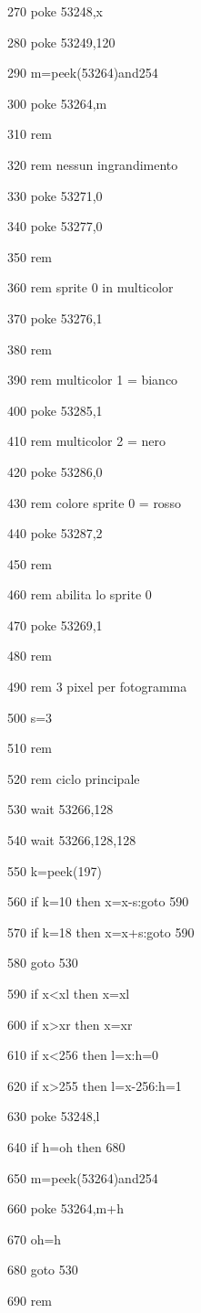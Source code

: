 \documentclass{article}
\begin{document}
270 poke 53248,x

280 poke 53249,120

290 m=peek(53264)and254

300 poke 53264,m

310 rem

320 rem nessun ingrandimento

330 poke 53271,0

340 poke 53277,0

350 rem

360 rem sprite 0 in multicolor

370 poke 53276,1

380 rem

390 rem multicolor 1 = bianco

400 poke 53285,1

410 rem multicolor 2 = nero

420 poke 53286,0

430 rem colore sprite 0 = rosso

440 poke 53287,2

450 rem

460 rem abilita lo sprite 0

470 poke 53269,1

480 rem

490 rem 3 pixel per fotogramma

500 s=3

510 rem

520 rem ciclo principale

530 wait 53266,128

540 wait 53266,128,128

550 k=peek(197)

560 if k=10 then x=x-s:goto 590

570 if k=18 then x=x+s:goto 590

580 goto 530

590 if x{\textless}xl then x=xl

600 if x{\textgreater}xr then x=xr

610 if x{\textless}256 then l=x:h=0

620 if x{\textgreater}255 then l=x-256:h=1

630 poke 53248,l

640 if h=oh then 680

650 m=peek(53264)and254

660 poke 53264,m+h

670 oh=h

680 goto 530

690 rem
\end{document}
